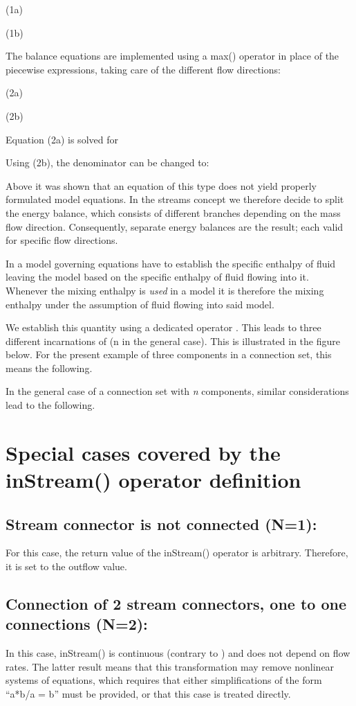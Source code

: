 \documentclass[10pt,a4paper]{report}
\def\doublelabel#1{\label{#1}\hypertarget{#1}{}}
\begin{document}
(1a)

(1b)

The balance equations are implemented using a max() operator in place of
the piecewise expressions, taking care of the different flow directions:

(2a)

(2b)

Equation (2a) is solved for

Using (2b), the denominator can be changed to:

Above it was shown that an equation of this type does not yield properly
formulated model equations. In the streams concept we therefore decide
to split the energy balance, which consists of different branches
depending on the mass flow direction. Consequently, separate energy
balances are the result; each valid for specific flow directions.

In a model governing equations have to establish the specific enthalpy
of fluid leaving the model based on the specific enthalpy of fluid
flowing into it. Whenever the mixing enthalpy is \emph{used} in a model
it is therefore the mixing enthalpy under the assumption of fluid
flowing into said model.

We establish this quantity using a dedicated operator . This leads to
three different incarnations of (n in the general case). This is
illustrated in the figure below. For the present example of three
components in a connection set, this means the following.


In the general case of a connection set with \emph{n} components,
similar considerations lead to the following.

\section{Special cases covered by the inStream() operator definition}\doublelabel{special-cases-covered-by-the-instream-operator-definition}
\subsection{Stream connector is not connected (N=1):}\doublelabel{stream-connector-is-not-connected-n-1}
For this case, the return value of the inStream() operator is arbitrary.
Therefore, it is set to the outflow value.

\subsection{Connection of 2 stream connectors, one to one connections (N=2):}\doublelabel{connection-of-2-stream-connectors-one-to-one-connections-n-2}
In this case, inStream() is continuous (contrary to ) and does not
depend on flow rates. The latter result means that this transformation
may remove nonlinear systems of equations, which requires that either
simplifications of the form ``a*b/a = b'' must be provided, or that this
case is treated directly.
\end{document}
